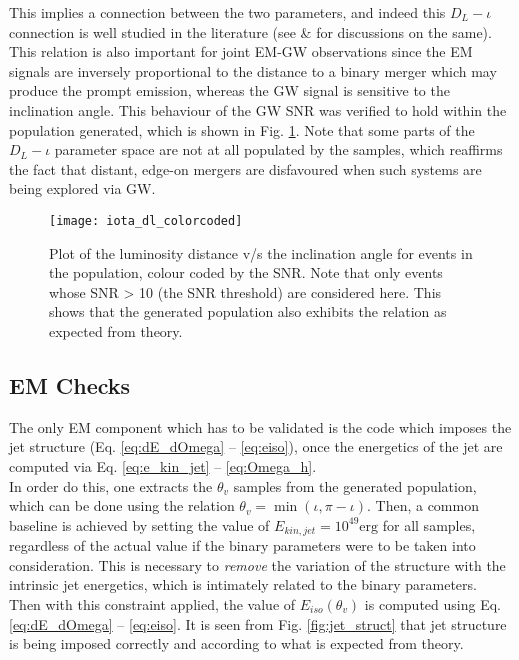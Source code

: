         This implies a connection between the two parameters, and indeed this $D_L-\iota
        $ connection is well studied in the literature (see \cite{schutz_2011} \&
        \cite{seto_2015} for discussions on the same). This relation is also important
        for joint EM-GW observations since the EM signals are inversely proportional to
        the distance to a binary merger which may produce the prompt emission, whereas
        the GW signal is sensitive to the inclination angle. This behaviour of the GW
        SNR was verified to hold within the population generated, which is shown in Fig.
        \ref{fig:dl_iota_correlation}. Note that some parts of the $D_L - \iota$
        parameter space are not at all populated by the samples, which reaffirms the
        fact that distant, edge-on mergers are disfavoured when such systems are being
        explored via GW.

        \begin{figure}[htpb]
            \centering
            \texttt{[image: iota\_dl\_colorcoded]}
            \caption[$D_L-\iota$ correlation in the population]{
                Plot of the luminosity distance v/s the inclination angle for events in
                the population, colour coded by the SNR. Note that only events whose SNR
                > 10 (the SNR threshold) are considered here.  This shows that the
                generated population also exhibits the relation as expected from theory.
            }
            \label{fig:dl_iota_correlation}
        \end{figure}

    \subsection{EM Checks}\label{sub:em_checks}

    The only EM component which has to be validated is the code which imposes the jet
    structure (Eq. \ref{eq:dE_dOmega} -- \ref{eq:eiso}), once the energetics of the jet
    are computed via Eq. \ref{eq:e_kin_jet} -- \ref{eq:Omega_h}.\\
    In order do this, one extracts the $\theta_v$ samples from the generated population,
    which can be done using the relation $\theta_v = \min(\iota, \pi - \iota)$. Then, a
    common baseline is achieved by setting the value of $E_{kin, jet} = 10^{49} \text{
    erg}$ for all samples, regardless of the actual value if the binary parameters were
    to be taken into consideration. This is necessary to \emph{remove} the variation of
    the structure with the intrinsic jet energetics, which is intimately related to the
    binary parameters.\\
    Then with this constraint applied, the value of $E_{iso}(\theta_v)$ is computed
    using Eq.  \ref{eq:dE_dOmega} -- \ref{eq:eiso}. It is seen from Fig.
    \ref{fig:jet_struct} that jet structure is being imposed correctly and according to
    what is expected from theory.


